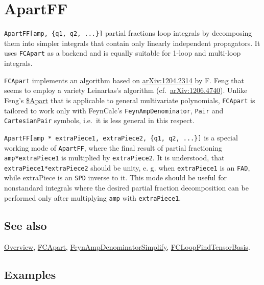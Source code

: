 \documentclass[../FeynCalcManual.tex]{subfiles}
\begin{document}
\hypertarget{apartff}{
\section{ApartFF}\label{apartff}}

\texttt{ApartFF[\allowbreak{}amp,\ \allowbreak{}\{\allowbreak{}q1,\ \allowbreak{}q2,\ \allowbreak{}...\}]}
partial fractions loop integrals by decomposing them into simpler
integrals that contain only linearly independent propagators. It uses
\texttt{FCApart} as a backend and is equally suitable for 1-loop and
multi-loop integrals.

\texttt{FCApart} implements an algorithm based on
\href{https://arxiv.org/abs/1204.2314}{arXiv:1204.2314} by F. Feng that
seems to employ a variety Leinartas's algorithm
(cf.~\href{https://arxiv.org/abs/1206.4740}{arXiv:1206.4740}). Unlike
Feng's \href{https://github.com/F-Feng/APart}{\$Apart} that is
applicable to general multivariate polynomials, \texttt{FCApart} is
tailored to work only with FeynCalc's \texttt{FeynAmpDenominator},
\texttt{Pair} and \texttt{CartesianPair} symbols, i.e.~it is less
general in this respect.

\texttt{ApartFF[\allowbreak{}amp * extraPiece1,\ \allowbreak{}extraPiece2,\ \allowbreak{}\{\allowbreak{}q1,\ \allowbreak{}q2,\ \allowbreak{}...\}]}
is a special working mode of \texttt{ApartFF}, where the final result of
partial fractioning \texttt{amp*extraPiece1} is multiplied by
\texttt{extraPiece2}. It is understood, that
\texttt{extraPiece1*extraPiece2} should be unity, e. g. when
\texttt{extraPiece1} is an \texttt{FAD}, while extraPiece is an
\texttt{SPD} inverse to it. This mode should be useful for nonstandard
integrals where the desired partial fraction decomposition can be
performed only after multiplying \texttt{amp} with \texttt{extraPiece1}.

\subsection{See also}

\hyperlink{toc}{Overview}, \hyperlink{fcapart}{FCApart},
\hyperlink{feynampdenominatorsimplify}{FeynAmpDenominatorSimplify},
\hyperlink{fcloopfindtensorbasis}{FCLoopFindTensorBasis}.

\subsection{Examples}

\begin{Shaded}
\begin{Highlighting}[]
\OperatorTok{[]}
\end{Highlighting}
\end{Shaded}
\end{document}
